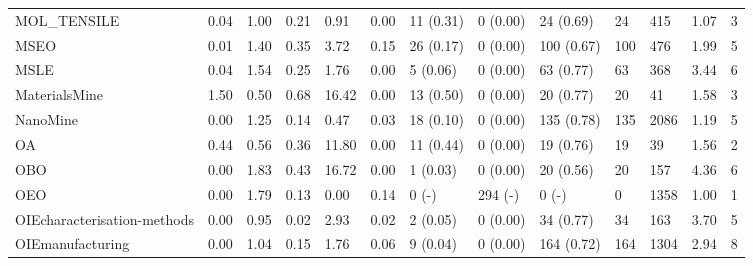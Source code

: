 \begin{table}
\begin{tabular}{m{3.5cm}m{2cm}m{2cm}m{2cm}m{2cm}m{2cm}m{2cm}m{2cm}m{2cm}m{2cm}m{2cm}m{2cm}m{2cm}}
MOL\_TENSILE                 &                0.04 &                  1.00 &                   0.21 &               0.91 &               0.00 &            11 (0.31) &   0 (0.00) &   24 (0.69) &   24 &             415 &     1.07 &          3 \\
MSEO                        &                0.01 &                  1.40 &                   0.35 &               3.72 &               0.15 &            26 (0.17) &   0 (0.00) &  100 (0.67) &  100 &             476 &     1.99 &          5 \\
MSLE                        &                0.04 &                  1.54 &                   0.25 &               1.76 &               0.00 &             5 (0.06) &   0 (0.00) &   63 (0.77) &   63 &             368 &     3.44 &          6 \\
MaterialsMine               &                1.50 &                  0.50 &                   0.68 &              16.42 &               0.00 &            13 (0.50) &   0 (0.00) &   20 (0.77) &   20 &              41 &     1.58 &          3 \\
NanoMine                    &                0.00 &                  1.25 &                   0.14 &               0.47 &               0.03 &            18 (0.10) &   0 (0.00) &  135 (0.78) &  135 &            2086 &     1.19 &          5 \\
OA                          &                0.44 &                  0.56 &                   0.36 &              11.80 &               0.00 &            11 (0.44) &   0 (0.00) &   19 (0.76) &   19 &              39 &     1.56 &          2 \\
OBO                         &                0.00 &                  1.83 &                   0.43 &              16.72 &               0.00 &             1 (0.03) &   0 (0.00) &   20 (0.56) &   20 &             157 &     4.36 &          6 \\
OEO                         &                0.00 &                  1.79 &                   0.13 &               0.00 &               0.14 &                0 (-) &    294 (-) &       0 (-) &    0 &            1358 &     1.00 &          1 \\
OIEcharacterisation-methods &                0.00 &                  0.95 &                   0.02 &               2.93 &               0.02 &             2 (0.05) &   0 (0.00) &   34 (0.77) &   34 &             163 &     3.70 &          5 \\
OIEmanufacturing            &                0.00 &                  1.04 &                   0.15 &               1.76 &               0.06 &             9 (0.04) &   0 (0.00) &  164 (0.72) &  164 &            1304 &     2.94 &          8 \\

\end{tabular}
\end{table}
